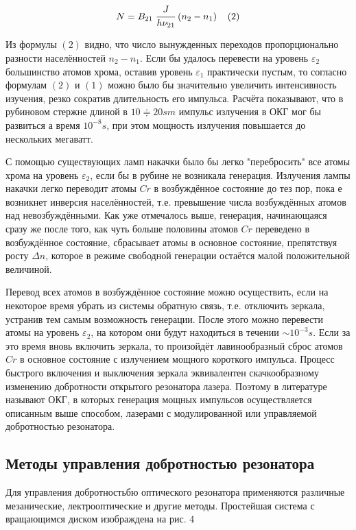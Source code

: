 \documentclass[a4paper,14pt,russian]{article}
\begin{document}
\begin{eqnarray}
N = B_{21} \; \cfrac {J} {h \nu_{21}} \; (n_2 - n_1) \;\;\;\; (2)
\end{eqnarray}

Из формулы $(2)$ видно, что число вынужденных переходов пропорционально разности населённостей $n_2 - n_1$. Если бы удалось перевести на уровень $\varepsilon_2$ большинство атомов хрома, оставив уровень $\varepsilon_1$ практически пустым, то согласно формулам $(2)$ и $(1)$ можно было бы значительно увеличить интенсивность изучения, резко сократив длительность его импульса. Расчёта показывают, что в рубиновом стержне длиной в $10 \Doteq 20 sm$ импульс излучения в ОКГ мог бы развиться а время $10^{-8} s$, при этом мощность излучения повышается до нескольких мегаватт.

С помощью существующих ламп накачки было бы легко "перебросить"  все атомы хрома на уровень $\varepsilon_2$, если бы в рубине не возникала генерация. Излучения лампы накачки легко переводит атомы $Cr$ в возбуждённое состояние до тез пор, пока е возникнет инверсия населённостей, т.е. превышение числа возбуждённых атомов над невозбуждёнными. Как уже отмечалось выше, генерация, начинающаяся сразу же после того, как чуть больше половины атомов $Cr$ переведено в возбуждённое состояние, сбрасывает атомы в основное состояние, препятствуя росту $\Delta n$, которое в режиме свободной генерации остаётся малой положительной величиной.

Перевод всех атомов в возбуждённое состояние можно осуществить, если на некоторое время убрать из системы обратную связь, т.е. отключить зеркала, устранив тем самым возможность генерации. После этого можно перевести атомы на уровень $\varepsilon_2$, на котором они будут находиться в течении $\sim 10^{-3} s$. Если за это время вновь включить зеркала, то произойдёт лавинообразный сброс атомов $Cr$ в основное состояние с излучением мощного короткого импульса. Процесс быстрого включения и выключения зеркала эквивалентен скачкообразному изменению добротности открытого резонатора лазера. Поэтому в литературе называют ОКГ, в которых генерация мощных импульсов осуществляется описанным выше способом, лазерами с модулированной или управляемой добротностью резонатора.

\subsection {Методы управления добротностью резонатора}

Для управления добротностьбю оптического резонатора применяются различные мезанические, лектрооптические и другие методы. Простейшая система с вращающимся диском изображдена на рис. 4
\end{document}

